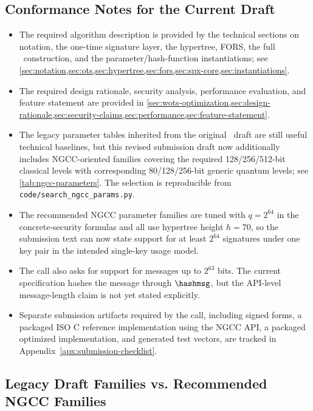 \subsection{Conformance Notes for the Current Draft}

\begin{itemize}
    \item The required algorithm description is provided by the technical sections on notation, the one-time signature layer, the hypertree, FORS, the full \SPHINCSA\ construction, and the parameter/hash-function instantiations; see \cref{sec:notation,sec:ots,sec:hypertree,sec:fors,sec:spx-core,sec:instantiations}.
    \item The required design rationale, security analysis, performance evaluation, and feature statement are provided in \cref{sec:wots-optimization,sec:design-rationale,sec:security-claims,sec:performance,sec:feature-statement}.
    \item The legacy parameter tables inherited from the original \SPHINCSA\ draft are still useful technical baselines, but this revised submission draft now additionally includes NGCC-oriented families covering the required 128/256/512-bit classical levels with corresponding 80/128/256-bit generic quantum levels; see \cref{tab:ngcc-parameters}. The selection is reproducible from \texttt{code/search\_ngcc\_params.py}.
    \item The recommended NGCC parameter families are tuned with $q=2^{64}$ in the concrete-security formulas and all use hypertree height $h=70$, so the submission text can now state support for at least $2^{64}$ signatures under one key pair in the intended single-key usage model.
    \item The call also asks for support for messages up to $2^{63}$ bits. The current specification hashes the message through $\hashmsg$, but the API-level message-length claim is not yet stated explicitly. 
    \item Separate submission artifacts required by the call, including signed forms, a packaged ISO C reference implementation using the NGCC API, a packaged optimized implementation, and generated test vectors, are tracked in Appendix~\ref{apx:submission-checklist}.
\end{itemize}

\subsection{Legacy Draft Families vs. Recommended NGCC Families}

